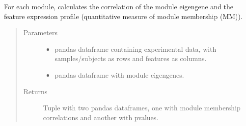 \documentclass[letterpaper,10pt,english]{sphinxmanual}
\begin{document}
\begin{fulllineitems}
\label{\detokenize{_autosummary/analytics_core.analytics:analytics_core.analytics.wgcnaAnalysis.calculate_ModuleMembership}}
For each module, calculates the correlation of the module eigengene and the feature expression profile (quantitative measure of module membership (MM)).
\begin{quote}\begin{description}
\item[{Parameters}] \leavevmode\begin{itemize}
\item {} 
 \textendash{} pandas dataframe containing experimental data, with samples/subjects as rows and features as columns.

\item {} 
 \textendash{} pandas dataframe with module eigengenes.

\end{itemize}

\item[{Returns}] \leavevmode
Tuple with two pandas dataframes, one with module membership correlations and another with p\sphinxhyphen{}values.

\end{description}\end{quote}

\end{fulllineitems}

\end{document}
